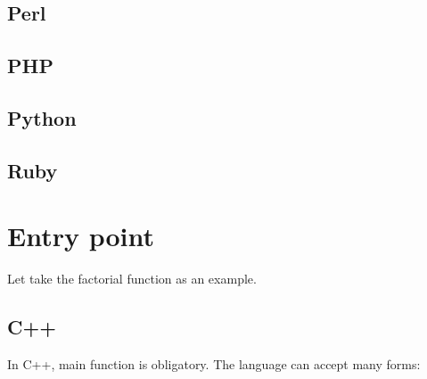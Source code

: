 \documentclass{KodeBook}
\begin{document}
\subsection{Perl}



\subsection{PHP}



\subsection{Python}



\subsection{Ruby}




\section{Entry point}

Let take the factorial function as an example. 


\subsection{C++}

In C++, main function is obligatory. 
The language can accept many forms: 




%
\end{document}
